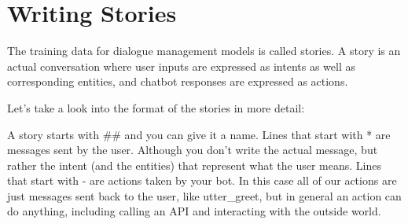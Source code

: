 \documentclass[11pt]{article}
\begin{document}
    \section{Writing Stories}\label{writing-stories}
The training data for dialogue management models is called stories. A story is an actual conversation where user inputs are expressed as intents as well as corresponding entities, and chatbot responses are expressed as actions.

Let's take a look into the format of the stories in more detail:

A story starts with ## and you can give it a name. Lines that start with * are messages sent by the user. Although you don't write the actual message, but rather the intent (and the entities) that represent what the user means. Lines that start with - are actions taken by your bot. In this case all of our actions are just messages sent back to the user, like utter_greet, but in general an action can do anything, including calling an API and interacting with the outside world.
\end{document}
